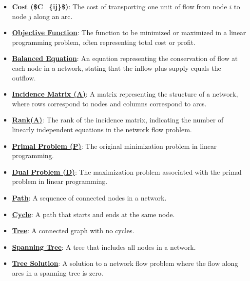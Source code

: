 \documentclass{article}%
\begin{document}
\begin{itemize}[leftmargin=*]
\item \href{https://www.math.purdue.edu/~yipn/421/2024-11-05-NetFlows.pdf#page=2}{\textbf{Cost (\$C\_\{ij\}\$)}}: The cost of transporting one unit of flow from node $i$ to node $j$ along an arc. %
\item \href{https://www.math.purdue.edu/~yipn/421/2024-11-05-NetFlows.pdf#page=2}{\textbf{Objective Function}}: The function to be minimized or maximized in a linear programming problem, often representing total cost or profit. %
\item \href{https://www.math.purdue.edu/~yipn/421/2024-11-05-NetFlows.pdf#page=3}{\textbf{Balanced Equation}}: An equation representing the conservation of flow at each node in a network, stating that the inflow plus supply equals the outflow. %
\item \href{https://www.math.purdue.edu/~yipn/421/2024-11-05-NetFlows.pdf#page=4}{\textbf{Incidence Matrix (A)}}: A matrix representing the structure of a network, where rows correspond to nodes and columns correspond to arcs. %
\item \href{https://www.math.purdue.edu/~yipn/421/2024-11-05-NetFlows.pdf#page=6}{\textbf{Rank(A)}}: The rank of the incidence matrix, indicating the number of linearly independent equations in the network flow problem. %
\item \href{https://www.math.purdue.edu/~yipn/421/2024-11-05-NetFlows.pdf#page=7}{\textbf{Primal Problem (P)}}: The original minimization problem in linear programming. %
\item \href{https://www.math.purdue.edu/~yipn/421/2024-11-05-NetFlows.pdf#page=7}{\textbf{Dual Problem (D)}}: The maximization problem associated with the primal problem in linear programming. %
\item \href{https://www.math.purdue.edu/~yipn/421/2024-11-05-NetFlows.pdf#page=10}{\textbf{Path}}: A sequence of connected nodes in a network. %
\item \href{https://www.math.purdue.edu/~yipn/421/2024-11-05-NetFlows.pdf#page=10}{\textbf{Cycle}}: A path that starts and ends at the same node. %
\item \href{https://www.math.purdue.edu/~yipn/421/2024-11-05-NetFlows.pdf#page=10}{\textbf{Tree}}: A connected graph with no cycles. %
\item \href{https://www.math.purdue.edu/~yipn/421/2024-11-05-NetFlows.pdf#page=10}{\textbf{Spanning Tree}}: A tree that includes all nodes in a network. %
\item \href{https://www.math.purdue.edu/~yipn/421/2024-11-05-NetFlows.pdf#page=11}{\textbf{Tree Solution}}: A solution to a network flow problem where the flow along arcs in a spanning tree is zero. %

\end{itemize}
\end{document}
